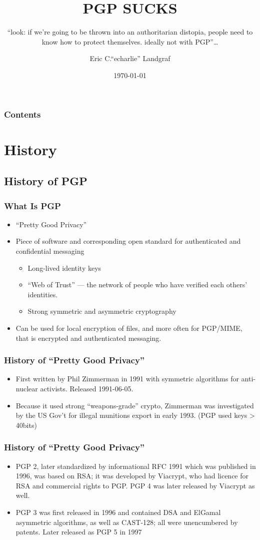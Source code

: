 \documentclass[aspectratio=1610,bigger,utf8]{beamer}
\title{PGP SUCKS}
\subtitle{``look: if we're going to be thrown into an authoritarian distopia, people need to know how to protect themselves. ideally not with PGP''\ldots}
\author{Eric C.``echarlie'' Landgraf}
\institute{VTLUUG}
\date{\today}
\begin{document}
\frame{\titlepage}

\begin{frame}
	\frametitle{Contents}
	\tableofcontents[hideallsubsections]

\end{frame}

\section{History}
\subsection{History of PGP}
\begin{frame}
	\frametitle{What Is PGP}
	\begin{itemize}
		\item ``Pretty Good Privacy''
		\item Piece of software and corresponding open standard for
			authenticated and confidential messaging
			\begin{itemize}
				\item Long-lived identity keys
				\item ``Web of Trust'' --- the network of
					people who have verified each others'
					identities.
				\item Strong symmetric and asymmetric
					cryptography
			\end{itemize}
		\item Can be used for local encryption of files, and more often
			for PGP/MIME, that is encrypted and authenticated
			messaging.
	\end{itemize}
\end{frame}
\begin{frame}
	\frametitle{History of ``Pretty Good Privacy''}
	\begin{itemize}
		\item First written by Phil Zimmerman in 1991 with symmetric
			algorithms for anti-nuclear activists. Released
			1991-06-05.
		\item Because it used strong ``weapons-grade'' crypto,
			Zimmerman was investigated by the US Gov't for illegal
			munitions export in early 1993. (PGP used keys >
			40bits)
	\end{itemize}
\end{frame}
\begin{frame}
	\frametitle{History of ``Pretty Good Privacy''}
	\begin{itemize}
		\item PGP 2, later standardized by informational \alert{RFC
			1991} which was published in 1996, was based on RSA; it
			was developed by Viacrypt, who had licence for RSA and
			commercial rights to PGP. PGP 4 was later released by
			Viacrypt as well.
		\item PGP 3 was first released in 1996 and contained DSA and
			ElGamal asymmetric algorithms, as well as CAST-128; all
			were unencumbered by patents. Later released as PGP 5
			in 1997
	\end{itemize}
\end{frame}
\end{document}
